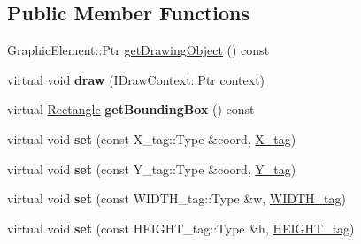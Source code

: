 \subsection*{Public Member Functions}
\begin{DoxyCompactItemize}
\item 
GraphicElement::Ptr \hyperlink{classsambag_1_1disco_1_1svg_1_1_svg_rect_ad21262edb7fda1a7ab1a45ef15c2f303}{getDrawingObject} () const 
\item 
\hypertarget{classsambag_1_1disco_1_1svg_1_1_svg_rect_a1a31a397e5c6aad2c83e07318278139a}{
virtual void {\bfseries draw} (IDrawContext::Ptr context)}
\label{classsambag_1_1disco_1_1svg_1_1_svg_rect_a1a31a397e5c6aad2c83e07318278139a}

\item 
\hypertarget{classsambag_1_1disco_1_1svg_1_1_svg_rect_a8b98650b0a06c0402f9f1e41f915e401}{
virtual \hyperlink{classsambag_1_1com_1_1_rectangle}{Rectangle} {\bfseries getBoundingBox} () const }
\label{classsambag_1_1disco_1_1svg_1_1_svg_rect_a8b98650b0a06c0402f9f1e41f915e401}

\item 
\hypertarget{classsambag_1_1disco_1_1svg_1_1_svg_rect_ad0c483c304a55b6cb0d0eb8a357c6b0d}{
virtual void {\bfseries set} (const X\_\-tag::Type \&coord, \hyperlink{structsambag_1_1disco_1_1svg_1_1_svg_rect_1_1_x__tag}{X\_\-tag})}
\label{classsambag_1_1disco_1_1svg_1_1_svg_rect_ad0c483c304a55b6cb0d0eb8a357c6b0d}

\item 
\hypertarget{classsambag_1_1disco_1_1svg_1_1_svg_rect_af57c645d66676b4424c39c000568e6a7}{
virtual void {\bfseries set} (const Y\_\-tag::Type \&coord, \hyperlink{structsambag_1_1disco_1_1svg_1_1_svg_rect_1_1_y__tag}{Y\_\-tag})}
\label{classsambag_1_1disco_1_1svg_1_1_svg_rect_af57c645d66676b4424c39c000568e6a7}

\item 
\hypertarget{classsambag_1_1disco_1_1svg_1_1_svg_rect_acc9f6e654790cee577766040f5fa3f8d}{
virtual void {\bfseries set} (const WIDTH\_\-tag::Type \&w, \hyperlink{structsambag_1_1disco_1_1svg_1_1_svg_rect_1_1_w_i_d_t_h__tag}{WIDTH\_\-tag})}
\label{classsambag_1_1disco_1_1svg_1_1_svg_rect_acc9f6e654790cee577766040f5fa3f8d}

\item 
\hypertarget{classsambag_1_1disco_1_1svg_1_1_svg_rect_a424bac3cb498825a3b46581c108d11f3}{
virtual void {\bfseries set} (const HEIGHT\_\-tag::Type \&h, \hyperlink{structsambag_1_1disco_1_1svg_1_1_svg_rect_1_1_h_e_i_g_h_t__tag}{HEIGHT\_\-tag})}
\label{classsambag_1_1disco_1_1svg_1_1_svg_rect_a424bac3cb498825a3b46581c108d11f3}

\end{DoxyCompactItemize}
